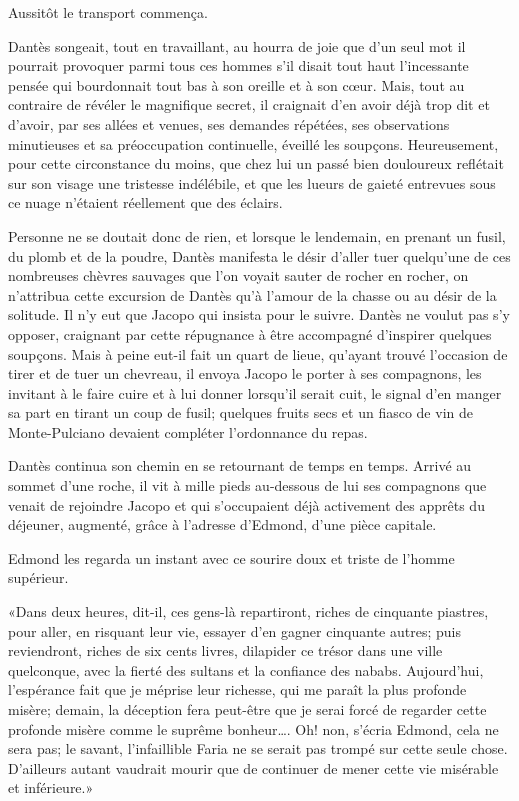 Aussitôt le transport commença.

Dantès songeait, tout en travaillant, au hourra de joie que d'un seul mot il pourrait provoquer parmi tous ces hommes s'il disait tout haut l'incessante pensée qui bourdonnait tout bas à son oreille et à son cœur. Mais, tout au contraire de révéler le magnifique secret, il craignait d'en avoir déjà trop dit et d'avoir, par ses allées et venues, ses demandes répétées, ses observations minutieuses et sa préoccupation continuelle, éveillé les soupçons. Heureusement, pour cette circonstance du moins, que chez lui un passé bien douloureux reflétait sur son visage une tristesse indélébile, et que les lueurs de gaieté entrevues sous ce nuage n'étaient réellement que des éclairs.

Personne ne se doutait donc de rien, et lorsque le lendemain, en prenant un fusil, du plomb et de la poudre, Dantès manifesta le désir d'aller tuer quelqu'une de ces nombreuses chèvres sauvages que l'on voyait sauter de rocher en rocher, on n'attribua cette excursion de Dantès qu'à l'amour de la chasse ou au désir de la solitude. Il n'y eut que Jacopo qui insista pour le suivre. Dantès ne voulut pas s'y opposer, craignant par cette répugnance à être accompagné d'inspirer quelques soupçons. Mais à peine eut-il fait un quart de lieue, qu'ayant trouvé l'occasion de tirer et de tuer un chevreau, il envoya Jacopo le porter à ses compagnons, les invitant à le faire cuire et à lui donner lorsqu'il serait cuit, le signal d'en manger sa part en tirant un coup de fusil; quelques fruits secs et un fiasco de vin de Monte-Pulciano devaient compléter l'ordonnance du repas.

Dantès continua son chemin en se retournant de temps en temps. Arrivé au sommet d'une roche, il vit à mille pieds au-dessous de lui ses compagnons que venait de rejoindre Jacopo et qui s'occupaient déjà activement des apprêts du déjeuner, augmenté, grâce à l'adresse d'Edmond, d'une pièce capitale.

Edmond les regarda un instant avec ce sourire doux et triste de l'homme supérieur.

«Dans deux heures, dit-il, ces gens-là repartiront, riches de cinquante piastres, pour aller, en risquant leur vie, essayer d'en gagner cinquante autres; puis reviendront, riches de six cents livres, dilapider ce trésor dans une ville quelconque, avec la fierté des sultans et la confiance des nababs. Aujourd'hui, l'espérance fait que je méprise leur richesse, qui me paraît la plus profonde misère; demain, la déception fera peut-être que je serai forcé de regarder cette profonde misère comme le suprême bonheur\dots. Oh! non, s'écria Edmond, cela ne sera pas; le savant, l'infaillible Faria ne se serait pas trompé sur cette seule chose. D'ailleurs autant vaudrait mourir que de continuer de mener cette vie misérable et inférieure.»

